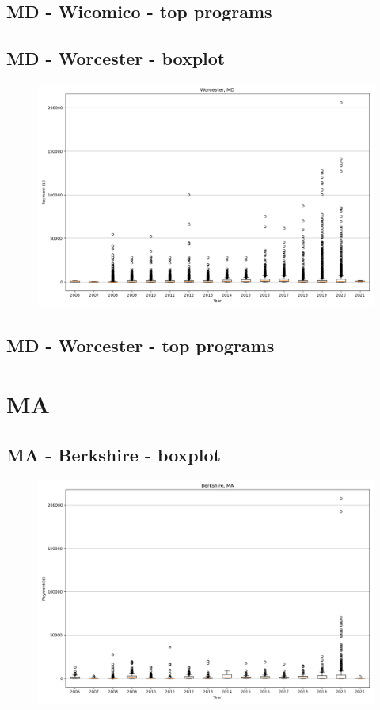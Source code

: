 \subsection*{MD - Wicomico - top programs}

\newpage
\subsection*{MD - Worcester - boxplot}
\begin{figure}[h]
\centering
\includegraphics[width=7in]{../output/boxplots/counties/Worcester-MD_boxplot.png}
\end{figure}


\subsection*{MD - Worcester - top programs}

\newpage
\section*{MA}
\subsection*{MA - Berkshire - boxplot}
\begin{figure}[h]
\centering
\includegraphics[width=7in]{../output/boxplots/counties/Berkshire-MA_boxplot.png}
\end{figure}


